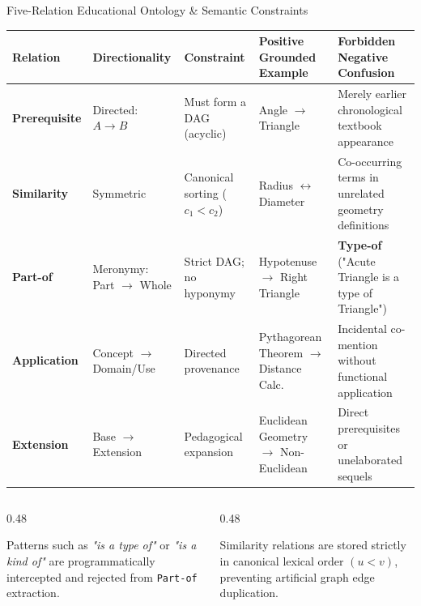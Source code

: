 \documentclass[aspectratio=169,10pt]{beamer}
\begin{document}
\begin{frame}{Five-Relation Educational Ontology \& Semantic Constraints}
    \centering
    \scriptsize
    \begin{tabularx}{\textwidth}{l p{2.4cm} p{2.2cm} p{3.2cm} X}
        \toprule
        \textbf{Relation} & \textbf{Directionality} & \textbf{Constraint} & \textbf{Positive Grounded Example} & \textbf{Forbidden Negative Confusion} \\
        \midrule
        \textbf{Prerequisite} & Directed: $A \to B$ & Must form a DAG (acyclic) & Angle $\to$ Triangle & Merely earlier chronological textbook appearance \\
        \addlinespace
        \textbf{Similarity} & Symmetric & Canonical sorting ($c_1 < c_2$) & Radius $\leftrightarrow$ Diameter & Co-occurring terms in unrelated geometry definitions \\
        \addlinespace
        \textbf{Part-of} & Meronymy: Part $\to$ Whole & Strict DAG; no hyponymy & Hypotenuse $\to$ Right Triangle & \textbf{Type-of} ("Acute Triangle is a type of Triangle") \\
        \addlinespace
        \textbf{Application} & Concept $\to$ Domain/Use & Directed provenance & Pythagorean Theorem $\to$ Distance Calc. & Incidental co-mention without functional application \\
        \addlinespace
        \textbf{Extension} & Base $\to$ Extension & Pedagogical expansion & Euclidean Geometry $\to$ Non-Euclidean & Direct prerequisites or unelaborated sequels \\
        \bottomrule
    \end{tabularx}

    \vspace{0.3cm}
    \begin{columns}[T]
        \begin{column}{0.48\textwidth}
            \begin{tcolorbox}[colback=white,colframe=primaryblue,title=\textbf{Hyponymy Rejection Check},sharp corners]
                \tiny Patterns such as \textit{"is a type of"} or \textit{"is a kind of"} are programmatically intercepted and rejected from \texttt{Part-of} extraction.
            \end{tcolorbox}
        \end{column}
        \begin{column}{0.48\textwidth}
            \begin{tcolorbox}[colback=white,colframe=accentteal,title=\textbf{Symmetric Canonicalization},sharp corners]
                \tiny Similarity relations are stored strictly in canonical lexical order $(u < v)$, preventing artificial graph edge duplication.
            \end{tcolorbox}
        \end{column}
    \end{columns}
\end{frame}
\end{document}
